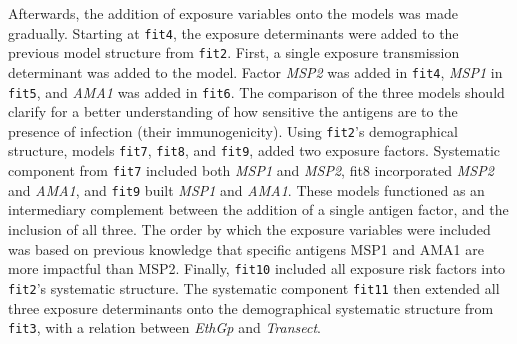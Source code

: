 Afterwards, the addition of exposure variables onto the models was made gradually.
Starting at \texttt{fit4}, the exposure determinants were added to the previous model structure from \texttt{fit2}.
First, a single exposure transmission determinant was added to the model.
Factor \textit{MSP2} was added in \texttt{fit4}, \textit{MSP1} in \texttt{fit5}, and \textit{AMA1} was added in \texttt{fit6}.
The comparison of the three models should clarify for a better understanding of how sensitive the antigens are to the presence of infection (their immunogenicity).
Using \texttt{fit2}'s demographical structure, models \texttt{fit7}, \texttt{fit8}, and \texttt{fit9}, added two exposure factors.
Systematic component from \texttt{fit7} included both \textit{MSP1} and \textit{MSP2}, fit8 incorporated \textit{MSP2} and \textit{AMA1}, and \texttt{fit9} built \textit{MSP1} and \textit{AMA1}.
These models functioned as an intermediary complement between the addition of a single antigen factor, and the inclusion of all three.
The order by which the exposure variables were included was based on previous knowledge that specific antigens MSP1 and AMA1 are more impactful than MSP2.
Finally, \texttt{fit10} included all exposure risk factors into \texttt{fit2}'s systematic structure.
The systematic component \texttt{fit11} then extended all three exposure determinants onto the demographical systematic structure from \texttt{fit3}, with a relation between \textit{EthGp} and \textit{Transect}.

